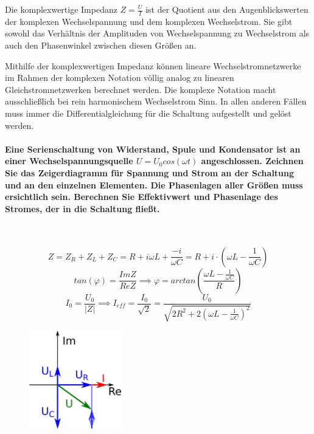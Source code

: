 \documentclass[a4paper, 11pt, parskip=half]{scrartcl}
\begin{document}
Die komplexwertige Impedanz $Z = \frac{U}{I}$ ist der Quotient aus den Augenblickswerten der
komplexen Wechselspannung und dem komplexen Wechselstrom. Sie gibt sowohl das Verhältnis der
Amplituden von Wechselspannung zu Wechselstrom als auch den Phasenwinkel zwischen diesen Größen an.

Mithilfe der komplexwertigen Impedanz können lineare Wechselstromnetzwerke im Rahmen der komplexen
Notation völlig analog zu linearen Gleichstromnetzwerken berechnet werden. Die komplexe Notation
macht ausschließlich bei rein harmonischem Wechselstrom Sinn. In allen anderen Fällen muss immer die
Differentialgleichung für die Schaltung aufgestellt und gelöst werden.

\paragraph{Eine Serienschaltung von Widerstand, Spule und Kondensator ist an einer
Wechselspannungsquelle $U=U_0 cos (\omega t)$ angeschlossen. Zeichnen Sie das Zeigerdiagramm für
Spannung und Strom an der Schaltung und an den einzelnen Elementen. Die Phasenlagen aller Größen
muss ersichtlich sein. Berechnen Sie Effektivwert und Phasenlage des Stromes, der in die Schaltung
fließt.} ~

\begin{equation}
    Z
    = Z_R + Z_L + Z_C
    = R + i \omega L + \frac{-i}{\omega C}
    = R + i \cdot \left(\omega L - \frac{1}{\omega C} \right)
\end{equation}
\begin{equation}
    tan(\varphi)
    = \frac{Im{Z}}{Re{Z}}
    \implies
    \varphi = arctan \left( \frac{\omega L - \frac{1}{\omega C}}{R} \right)
\end{equation}
\begin{equation}
    I_0
    = \frac{U_0}{|Z|}
    \implies
    I_{eff}
    = \frac{I_0}{\sqrt{2}}
    = \frac{U_0}{\sqrt{2 R^2 +2 \left(\omega L - \frac{1}{\omega C} \right)^2}}
\end{equation}

\begin{figure}[H]
    \centering
    \includegraphics[width=4cm]{image/10/2}
\end{figure}
\end{document}
